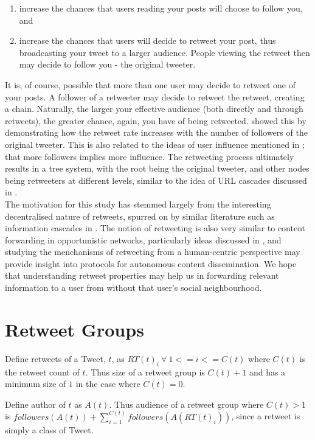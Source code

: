 \begin{enumerate}
\item increase the chances that users reading your posts will choose to follow you, and
\item increase the chances that users will decide to retweet your post, thus broadcasting your tweet to a larger audience. People viewing the retweet then may decide to follow you - the original tweeter. 
\end{enumerate}
It is, of course, possible that more than one user may decide to retweet one of your posts. A follower of a retweeter may decide to retweet the retweet, creating a chain. Naturally, the larger your effective audience (both directly and through retweets), the greater chance, again, you have of being retweeted. \cite{suh10} showed this by demonstrating how the retweet rate increases with the number of followers of the original tweeter. This is also related to the ideas of user influence mentioned in \cite{cha10}; that more followers implies more influence. The retweeting process ultimately results in a tree system, with the root being the original tweeter, and other nodes being retweeters at different levels, similar to the idea of URL cascades discussed in \cite{galuba10}.\\
The motivation for this study has stemmed largely from the interesting decentralised nature of retweets, spurred on by similar literature such as information cascades in \cite{galuba10}. The notion of retweeting is also very similar to content forwarding in opportunistic networks, particularly ideas discussed in \cite{allen10}, and studying the menchanisms of retweeting from a human-centric perspective may provide insight into protocols for autonomous content dissemination. We hope that understanding retweet properties may help us  in forwarding relevant information to a user from without that user's social neighbourhood.

\section{Retweet Groups}
Define retweets of a Tweet, $t$, as $RT(t)_i \: \forall \: 1 <= i <= C(t)$ where $C(t)$ is the retweet count of $t$. Thus size of a retweet group is $C(t)+1$ and has a minimum size of $1$ in the case where $C(t) = 0$.

Define author of $t$ as $A(t)$. Thus audience of a retweet group where $C(t) > 1$ is $followers(A(t)) + \sum\limits_{i=1}^{C(t)} followers(A(RT(t)_i))$, since a retweet is simply a class of Tweet.

